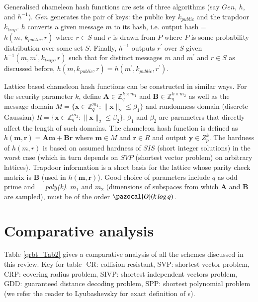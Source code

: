 \documentclass[10pt]{elsarticle}
\begin{document}
Generalised chameleon hash functions are sets of three algorithms
(say $Gen$, $h$, and $h^{-1}$). $Gen$ generates the pair of keys:
the public key $k_{public}$ and the trapdoor $k_{trap}$. $h$
converts a given message $m$ to its hash, i.e. output hash = $h(m,\,
k_{public}, r)$ where $r \in S$ and $r$ is drawn from $P$ where $P$
is some probability distribution over some set $S$. Finally,
$h^{-1}$ outputs $r^{\prime}$ over $S$ given $h^{-1}(m, m^{\prime},
k_{trap}, r)$ such that for distinct messages $m$ and $m^{\prime}$
and $r \in S$ as discussed before, $h(m, k_{public}, r) =
h(m^{\prime}, k_{public}, r^{\prime})$.

Lattice based chameleon hash functions can be constructed in similar ways. For the security parameter $k$, define $\mathbf{A} \in \mathbb{Z}_{q}^{k \times m_{1}}$ and $\mathbf{B} \in \mathbb{Z}_{q}^{k \times m_{2}}$ as well as the message domain $M = \{\mathbf{x} \in \mathbb{Z}_{q}^{m_{1}}: \parallel \mathbf{x} \parallel_{2} \leq \beta_{1}\}$ and randomness domain (discrete Gaussian) $R = \{\mathbf{x} \in \mathbb{Z}_{q}^{m_{2}}: \parallel \mathbf{x} \parallel_{2} \leq \beta_{2}\}$. $\beta_{1}$ and $\beta_{2}$ are parameters that directly affect the length of such domains. The chameleon hash function is defined as $h(\mathbf{m}, \mathbf{r}) = \mathbf{A} \mathbf{m} + \mathbf{B} \mathbf{r}$ where $\mathbf{m} \in M$ and $\mathbf{r} \in R$ and output $\mathbf{y} \in Z_{p}^{k}$. The hardness of $h(m, r)$ is based on assumed hardness of $SIS$ (short integer solutions) in the worst case (which in turn depends on $SVP$ (shortest vector problem) on arbitrary lattices). Trapdoor information is a short basis for the lattice whose parity check matrix is $\mathbf{B}$ (used in $h(\mathbf{m}, \mathbf{r})$). Good choice of parameters include $q$ as odd prime and \textit{= poly(k)}. $m_{1}$ and $m_{2}$ (dimensions of subspaces from which $\mathbf{A}$ and $\mathbf{B}$ are sampled), must be of the order $\pazocal{O}(k\, log\, q)$.


\section{Comparative analysis}

Table \ref{qrbt_Tab2} gives a comparative analysis of all the schemes discussed in this review. Key for table- CR: collision resistant, SVP: shortest vector problem, CRP: covering radius problem, SIVP: shortest independent vectors problem, GDD: guaranteed distance decoding problem, SPP: shortest polynomial problem (we refer the reader to Lyubashevsky\cite{CRHF_Lyubashevsky2006} for exact definition of $\mathcal{\epsilon}$).
\end{document}
